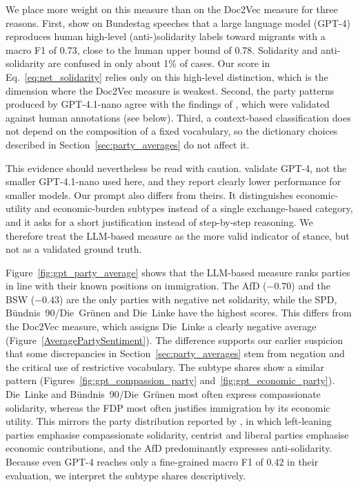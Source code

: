 \documentclass[12pt]{scrartcl}
\numberwithin{equation}{section}				%
\begin{document}
      We place more weight on this measure than on the Doc2Vec measure for three reasons. First, \textcite{kostikova2024fine} show on Bundestag speeches that a large language model (GPT-4) reproduces human high-level (anti-)solidarity labels toward migrants with a macro F1 of 0.73, close to the human upper bound of 0.78. Solidarity and anti-solidarity are confused in only about 1\% of cases. Our score in Eq.~\eqref{eq:net_solidarity} relies only on this high-level distinction, which is the dimension where the Doc2Vec measure is weakest. Second, the party patterns produced by GPT-4.1-nano agree with the findings of \textcite{kostikova2024fine}, which were validated against human annotations (see below). Third, a context-based classification does not depend on the composition of a fixed vocabulary, so the dictionary choices described in Section~\ref{sec:party_averages} do not affect it.
      
      This evidence should nevertheless be read with caution. \textcite{kostikova2024fine} validate GPT-4, not the smaller GPT-4.1-nano used here, and they report clearly lower performance for smaller models. Our prompt also differs from theirs. It distinguishes economic-utility and economic-burden subtypes instead of a single exchange-based category, and it asks for a short justification instead of step-by-step reasoning. We therefore treat the LLM-based measure as the more valid indicator of stance, but not as a validated ground truth.
      
      Figure~\ref{fig:gpt_party_average} shows that the LLM-based measure ranks parties in line with their known positions on immigration. The AfD ($-0.70$) and the BSW ($-0.43$) are the only parties with negative net solidarity, while the SPD, Bündnis~90/Die~Grünen and Die~Linke have the highest scores. This differs from the Doc2Vec measure, which assigns Die~Linke a clearly negative average (Figure~\ref{AveragePartySentiment}). The difference supports our earlier suspicion that some discrepancies in Section~\ref{sec:party_averages} stem from negation and the critical use of restrictive vocabulary. The subtype shares show a similar pattern (Figures~\ref{fig:gpt_compassion_party} and~\ref{fig:gpt_economic_party}). Die~Linke and Bündnis~90/Die~Grünen most often express compassionate solidarity, whereas the FDP most often justifies immigration by its economic utility. This mirrors the party distribution reported by \textcite{kostikova2024fine}, in which left-leaning parties emphasise compassionate solidarity, centrist and liberal parties emphasise economic contributions, and the AfD predominantly expresses anti-solidarity. Because even GPT-4 reaches only a fine-grained macro F1 of 0.42 in their evaluation, we interpret the subtype shares descriptively.
      
\end{document}
